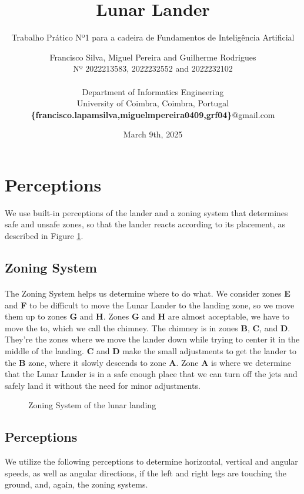 \documentclass{article}
\title{\textbf{Lunar Lander}}
\subtitle{Trabalho Prático Nº1 para a cadeira de Fundamentos de Inteligência Artificial}
\author{Francisco Silva, Miguel Pereira and Guilherme Rodrigues 
\\ Nº 2022213583, 2022232552 and 2022232102 \\ \\
Department of Informatics Engineering \\
University of Coimbra, Coimbra, Portugal
\\ \textbf{\{francisco.lapamsilva,miguelmpereira0409,grf04\}}@gmail.com}
\date{March 9th, 2025}
\begin{document}
\maketitle

\section{Perceptions}
We use built-in perceptions of the lander and a zoning system that determines safe and unsafe zones, so that the lander reacts according to its placement, as described in Figure \ref{fig:zoningsystem}.
\subsection{Zoning System}
\paragraph{}The Zoning System helps us determine where to do what. We consider zones \textbf{E} and \textbf{F} to be difficult to move the Lunar Lander to the landing zone, so we move them up to zones \textbf{G} and \textbf{H}. Zones \textbf{G} and \textbf{H} are almost acceptable, we have to move the to, which we call the chimney.  The chimney is in zones \textbf{B}, \textbf{C}, and \textbf{D}. They're the zones where we move the lander down while trying to center it in the middle of the landing. \textbf{C} and \textbf{D} make the small adjustments to get the lander to the \textbf{B} zone, where it slowly descends to zone \textbf{A}.  Zone \textbf{A} is where we determine that the Lunar Lander is in a safe enough place that we can turn off the jets and safely land it without the need for minor adjustments.

\begin{figure}[htbp]
\centering

\caption{\label{fig:zoningsystem}Zoning System of the lunar landing}
\end{figure}

\subsection{Perceptions}
We utilize the following perceptions to determine horizontal, vertical and angular speeds, as well as angular directions, if the left and right legs are touching the ground, and, again, the zoning systems.
\end{document}
